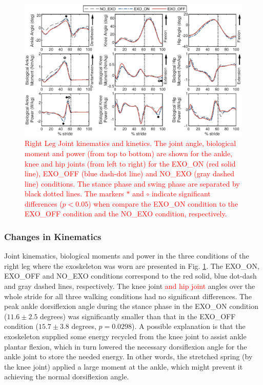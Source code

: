 \documentclass[twocolumn,cleanfoot,10pt]{asme2ej}
\begin{document}
\begin{figure}[th]
	\centering
	\includegraphics[width=17cm]{compare.eps}
	\caption{\textcolor{red}{Right Leg Joint kinematics and kinetics.
	The joint angle, biological moment and power (from top to bottom) are shown for the ankle, knee and hip joints (from left to right) for the EXO\_ON (red solid line), EXO\_OFF (blue dash-dot line) and NO\_EXO (gray dashed line) conditions.
	The stance phase and swing phase are separated by black dotted lines.
	The markers $*$ and $\circ$ indicate significant differences ($p<0.05$) when compare the EXO\_ON condition to the EXO\_OFF condition and the NO\_EXO condition, respectively.}}
	\label{fig:kinetics_r}
\end{figure}

\subsubsection{Changes in Kinematics}
Joint kinematics, biological moments and power in the three conditions of the right leg where the exoskeleton was worn are presented in Fig. \ref{fig:kinetics_r}.
The EXO\_ON, EXO\_OFF and NO\_EXO conditions correspond to the red solid, blue dot-dash and gray dashed lines, respectively.
The knee joint \textcolor{red}{and hip joint} angles over the whole stride for all three walking conditions had no significant differences.
The peak ankle dorsiflexion angle during the stance phase in the EXO\_ON condition ($11.6\pm2.5$ degrees) was significantly smaller than that in the EXO\_OFF condition ($15.7\pm3.8$ degrees, $p=0.0298$).
A possible explanation is that the exoskeleton supplied some energy recycled from the knee joint to assist ankle plantar flexion, which in turn lowered the necessary dorsiflexion angle for the ankle joint to store the needed energy.
In other words, the stretched spring (by the knee joint) applied a large moment at the ankle, which might prevent it achieving the normal dorsiflexion angle.
\end{document}
